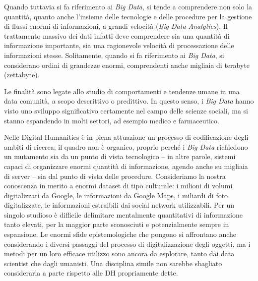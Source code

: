 \documentclass[
  b5paper,
  twoside,
  12pt,
  chapterprefix=false,
  bibliography=totocnumbered,
  parskip=false]{scrbook}
\begin{document}
Quando tuttavia si fa riferimento ai \emph{Big Data}, si tende a comprendere
non solo la quantità, quanto anche l'insieme delle tecnologie e delle
procedure per la gestione di flussi enormi di informazioni, a grandi
velocità (\emph{Big Data Analytics}). Il trattamento massivo dei dati infatti
deve comprendere sia una quantità di informazione importante, sia una
ragionevole velocità di processazione delle informazioni stesse.
Solitamente, quando si fa riferimento ai \emph{Big Data}, si considerano
ordini di grandezze enormi, comprendenti anche migliaia di terabyte
(zettabyte).

Le finalità sono legate allo studio di comportamenti e tendenze umane in
una data comunità, a scopo descrittivo o predittivo. In questo senso, i
\emph{Big Data} hanno visto uno sviluppo significativo certamente nel campo
delle scienze sociali, ma si stanno espandendo in molti settori, ad
esempio medico e farmaceutico.

Nelle Digital Humanities è in piena attuazione un processo di
codificazione degli ambiti di ricerca; il quadro non è organico, proprio
perché i \emph{Big Data} richiedono un mutamento sia da un punto di vista
tecnologico -- in altre parole, sistemi capaci di organizzare enormi
quantità di informazione, agendo anche su migliaia di server -- sia dal
punto di vista delle procedure. Consideriamo la nostra conoscenza in
merito a enormi dataset di tipo culturale: i milioni di volumi
digitalizzati da Google, le informazioni da Google Maps, i miliardi di
foto digitalizzate, le informazioni estraibili dai social network
utilizzabili. Per un singolo studioso è difficile delimitare mentalmente
quantitativi di informazione tanto elevati, per la maggior parte
sconosciuti e potenzialmente sempre in espansione. Le enormi sfide
epistemologiche che pongono si affrontano anche considerando i diversi
passaggi del processo di digitalizzazione degli oggetti, ma i metodi per
un loro efficace utilizzo sono ancora da esplorare, tanto dai data
scientist che dagli umanisti. Una disciplina simile non sarebbe
sbagliato considerarla a parte rispetto alle DH propriamente dette.
\end{document}
